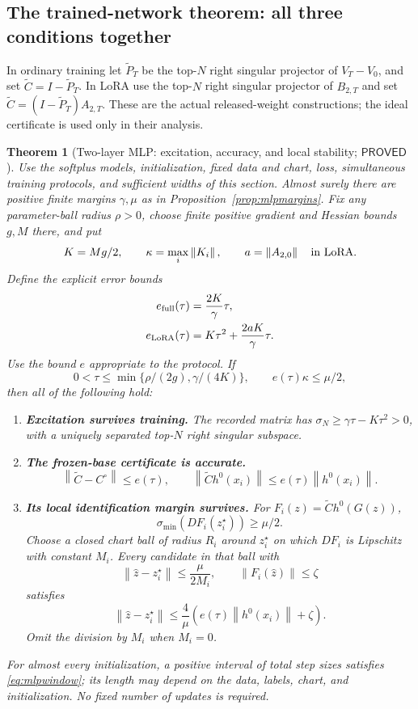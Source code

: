 \documentclass[12pt,a4paper]{article}
\theoremstyle{readable}
\newtheorem{theorem}{Theorem}[section]
\theoremstyle{definition}\newtheorem{example}[theorem]{Example}
\newcommand{\norm}[1]{\left\|#1\right\|}
\newcommand{\PP}{\mathsf{PROVED}}\newcommand{\FF}{\mathsf{FALSE}}
\begin{document}
\subsection{The trained-network theorem: all three conditions together}
In ordinary training let \(\widetilde P_T\) be the top-\(N\) right singular projector of \(V_T-V_0\), and set \(\widetilde C=I-\widetilde P_T\). In LoRA use the top-\(N\) right singular projector of \(B_{2,T}\) and set \(\widetilde C=(I-\widetilde P_T)A_{2,T}\). These are the actual released-weight constructions; the ideal certificate is used only in their analysis.

\begin{theorem}[Two-layer MLP: excitation, accuracy, and local stability; \(\PP\)]\label{thm:mlp}
Use the softplus models, initialization, fixed data and chart, loss, simultaneous training protocols, and sufficient widths of this section. Almost surely there are positive finite margins \(\gamma,\mu\) as in Proposition~\ref{prop:mlpmargins}. Fix any parameter-ball radius \(\rho>0\), choose finite positive gradient and Hessian bounds \(g,M\) there, and put
\[
K=Mg/2,\qquad \kappa=\max_i\norm{K_i},\qquad
a=\norm{A_{2,0}}\quad\hbox{in LoRA}.
\]
Define the explicit error bounds
\begin{align*}
e_{\rm full}(\tau)&=\frac{2K}{\gamma}\tau,\\
e_{\rm LoRA}(\tau)&=K\tau^2+\frac{2aK}{\gamma}\tau.
\end{align*}
Use the bound \(e\) appropriate to the protocol. If
\begin{equation}\label{eq:mlpwindow}
0<\tau\le\min\{\rho/(2g),\gamma/(4K)\},
\qquad e(\tau)\kappa\le\mu/2,
\end{equation}
then all of the following hold:
\begin{enumerate}
\item \textbf{Excitation survives training.} The recorded matrix has
\(\sigma_N\ge\gamma\tau-K\tau^2>0\), with a uniquely separated top-\(N\) right singular subspace.
\item \textbf{The frozen-base certificate is accurate.}
\[
\norm{\widetilde C-C^\circ}\le e(\tau),\qquad
\norm{\widetilde C h^0(x_i)}\le e(\tau)\norm{h^0(x_i)}.
\]
\item \textbf{Its local identification margin survives.} For
\(F_i(z)=\widetilde C h^0(G(z))\),
\[
\sigma_{\min}(DF_i(z_i^\star))\ge\mu/2.
\]
Choose a closed chart ball of radius \(R_i\) around \(z_i^\star\) on which \(DF_i\) is Lipschitz with constant \(M_i\). Every candidate in that ball with
\[
\norm{\widehat z-z_i^\star}\le\frac{\mu}{2M_i},
\qquad \norm{F_i(\widehat z)}\le\zeta
\]
satisfies
\begin{equation}\label{eq:mlpreconstruction}
\norm{\widehat z-z_i^\star}
\le\frac{4}{\mu}\left(e(\tau)\norm{h^0(x_i)}+\zeta\right).
\end{equation}
Omit the division by \(M_i\) when \(M_i=0\).
\end{enumerate}
For almost every initialization, a positive interval of total step sizes satisfies \eqref{eq:mlpwindow}; its length may depend on the data, labels, chart, and initialization. No fixed number of updates is required.
\end{theorem}
\end{document}
